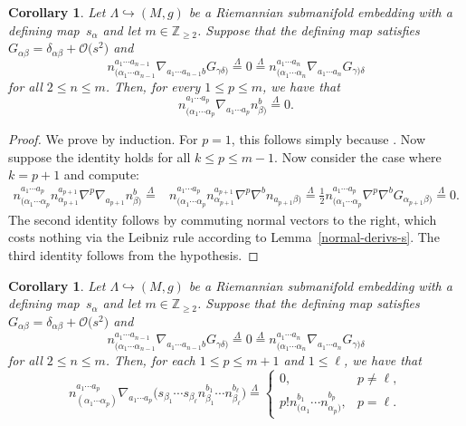 \documentclass[pdftex]{sigma}
\numberwithin{equation}{section}
\newtheorem{Corollary}[Theorem]{Corollary}
\renewcommand{\=}{\stackrel \Lambda =}
\begin{document}
\begin{Corollary} \label{normal-derivs-n}
Let $\Lambda \hookrightarrow (M,g)$ be a Riemannian submanifold embedding with a defining map~$s_{\alpha}$ and let $m \in \mathbb{Z}_{\geq 2}$. Suppose that the defining map satisfies $G_{\alpha \beta} = \delta_{\alpha \beta} + \mathcal{O}\bigl(s^2\bigr)$ and
\[n^{a_1 \cdots a_{n-1}}_{(\alpha_1 \cdots \alpha_{n-1}} \nabla_{a_1 \cdots a_{n-1} b} G_{\gamma \delta)} \= 0 \= n^{a_1 \cdots a_n}_{(\alpha_1 \cdots \alpha_n} \nabla_{a_1 \cdots a_n} G_{\gamma) \delta} \]
for all $2 \leq n \leq m$.
Then, for every $1 \leq p \leq m$, we have that
\[n^{a_1 \cdots a_p}_{(\alpha_1 \cdots \alpha_p} \nabla_{a_1 \cdots a_p} n^b_{\beta)} \= 0 .\]
\end{Corollary}
\begin{proof}
We prove by induction. For $p = 1$, this follows simply because \smash{$n^a_{(\alpha} \nabla_a n^b_{\beta)} \= \beta^b_{(\alpha \beta)} \= 0$}. Now suppose the identity holds for all $k \leq p \leq m-1$. Now consider the case where $k = p+1$ and compute:
\begin{align*}
n^{a_1 \cdots a_p}_{(\alpha_1 \cdots \alpha_p} n^{a_{p+1}}_{\alpha_{p+1}} \nabla^{p} \nabla_{a_{p+1}} n^{b}_{\beta)} \={}& n^{a_1 \cdots a_p}_{(\alpha_1 \cdots \alpha_p} n^{a_{p+1}}_{\alpha_{p+1}} \nabla^{p} \nabla^{b} n_{a_{p+1} \beta)}
\= \frac{1}{2} n^{a_1 \cdots a_p}_{(\alpha_1 \cdots \alpha_p} \nabla^{p} \nabla^{b} G_{\alpha_{p+1} \beta)}
\= 0 .
\end{align*}
The second identity follows by commuting normal vectors to the right, which costs nothing via the Leibniz rule according to Lemma~\ref{normal-derivs-s}. The third identity follows from the hypothesis.
\end{proof}

\begin{Corollary} \label{normal-derivs-sn}
Let $\Lambda \hookrightarrow (M,g)$ be a Riemannian submanifold embedding with a defining map~$s_{\alpha}$ and let $m \in \mathbb{Z}_{\geq 2}$. Suppose that the defining map satisfies $G_{\alpha \beta} = \delta_{\alpha \beta} + \mathcal{O}\bigl(s^2\bigr)$ and
\[n^{a_1 \cdots a_{n-1}}_{(\alpha_1 \cdots \alpha_{n-1}} \nabla_{a_1 \cdots a_{n-1} b} G_{\gamma \delta)} \= 0 \= n^{a_1 \cdots a_n}_{(\alpha_1 \cdots \alpha_n} \nabla_{a_1 \cdots a_n} G_{\gamma) \delta} \]
for all $2 \leq n \leq m$.
Then, for each $1 \leq p \leq m+1$ and $1 \leq \ell$, we have that
\[n^{a_1 \cdots a_p}_{(\alpha_1 \cdots \alpha_p)} \nabla_{a_1 \cdots a_p} \bigl(s_{\beta_1} \cdots s_{\beta_{\ell}} n^{b_1}_{\beta_1} \cdots n^{b_{\ell}}_{\beta_{\ell}}\bigr) \= \begin{cases}
0, & p \neq \ell, \\
p! n^{b_1}_{(\alpha_1} \cdots n^{b_p}_{\alpha_p)}, & p = \ell .
\end{cases}\]
\end{Corollary}
\end{document}
